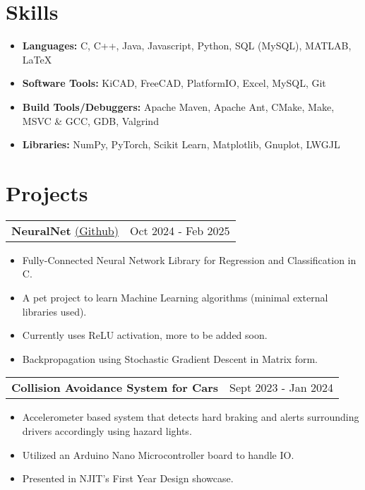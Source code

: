 \documentclass{article}
\begin{document}
\section{Skills} \vspace{4pt}
    \begin{itemize}
        \setlength{\itemsep}{-2pt}
        \item {\bf Languages:} C, C++, Java, Javascript, Python, SQL (MySQL), MATLAB, \LaTeX
        \item {\bf Software Tools:} KiCAD, FreeCAD, PlatformIO, Excel, MySQL, Git
        \item {\bf Build Tools/Debuggers:} Apache Maven, Apache Ant, CMake, Make, MSVC \& GCC, GDB, Valgrind
        \item {\bf Libraries:} NumPy, PyTorch, Scikit Learn, Matplotlib, Gnuplot, LWGJL
    \end{itemize}

\section{Projects}
    \raggedright\begin{tabular}{lr}
        \parbox[l]{3.65in}{{\bf{\large{NeuralNet}}} \href{https://github.com/avr34/NeuralNet}{(\underline{Github})}} &
        \parbox[r]{3.65in}{\raggedleft Oct 2024 - Feb 2025} \\
    \end{tabular}
    \begin{itemize} \vspace{-5pt}
        \setlength{\itemsep}{-2pt}
        \item Fully-Connected Neural Network Library for Regression and Classification in C.
        \item A pet project to learn Machine Learning algorithms (minimal external libraries used).
        \item Currently uses ReLU activation, more to be added soon.
        \item Backpropagation using Stochastic Gradient Descent in Matrix form.
    \end{itemize}

    \raggedright\begin{tabular}{lr}
        \parbox[l]{3.65in}{\bf{\large{Collision Avoidance System for Cars}}} &
        \parbox[r]{3.65in}{\raggedleft Sept 2023 - Jan 2024} \\
    \end{tabular}
    \begin{itemize} \vspace{-5pt}
        \setlength{\itemsep}{-2pt}
        \item Accelerometer based system that detects hard braking and alerts surrounding drivers accordingly using hazard lights.
        \item Utilized an Arduino Nano Microcontroller board to handle IO.
        \item Presented in NJIT's First Year Design showcase.
    \end{itemize}
    
\end{document}

